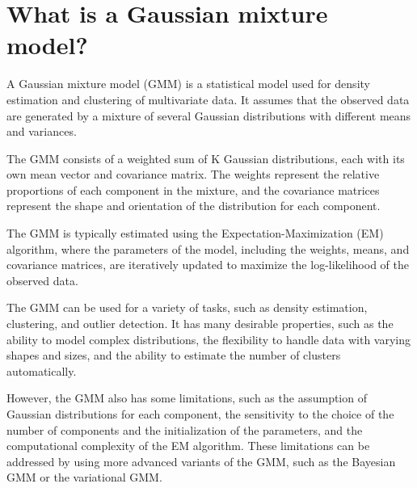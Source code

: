 \section{What is a Gaussian mixture model?}
A Gaussian mixture model (GMM) is a statistical model used for density estimation and clustering of multivariate data. It assumes that the observed data are generated by a mixture of several Gaussian distributions with different means and variances.

The GMM consists of a weighted sum of K Gaussian distributions, each with its own mean vector and covariance matrix. The weights represent the relative proportions of each component in the mixture, and the covariance matrices represent the shape and orientation of the distribution for each component.

The GMM is typically estimated using the Expectation-Maximization (EM) algorithm, where the parameters of the model, including the weights, means, and covariance matrices, are iteratively updated to maximize the log-likelihood of the observed data.

The GMM can be used for a variety of tasks, such as density estimation, clustering, and outlier detection. It has many desirable properties, such as the ability to model complex distributions, the flexibility to handle data with varying shapes and sizes, and the ability to estimate the number of clusters automatically.

However, the GMM also has some limitations, such as the assumption of Gaussian distributions for each component, the sensitivity to the choice of the number of components and the initialization of the parameters, and the computational complexity of the EM algorithm. These limitations can be addressed by using more advanced variants of the GMM, such as the Bayesian GMM or the variational GMM.

